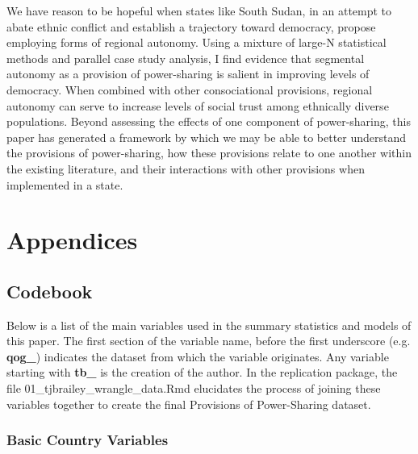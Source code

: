 \documentclass[12pt]{article}
\begin{document}
We have reason to be hopeful when states like South Sudan, in an attempt to abate ethnic conflict and establish a trajectory toward democracy, propose employing forms of regional autonomy. Using a mixture of large-N statistical methods and parallel case study analysis, I find evidence that segmental autonomy as a provision of power-sharing is salient in improving levels of democracy. When combined with other consociational provisions, regional autonomy can serve to increase levels of social trust among ethnically diverse populations. Beyond assessing the effects of one component of power-sharing, this paper has generated a framework by which we may be able to better understand the provisions of power-sharing, how these provisions relate to one another within the existing literature, and their interactions with other provisions when implemented in a state.

\pagebreak

\printbibliography

\pagebreak

\section{Appendices}
\subsection{Codebook}

Below is a list of the main variables used in the summary statistics and models of this paper. The first section of the variable name, before the first underscore (e.g. \textbf{qog\_}) indicates the dataset from which the variable originates. Any variable starting with \textbf{tb\_} is the creation of the author. In the replication package, the file 01\_tjbrailey\_wrangle\_data.Rmd elucidates the process of joining these variables together to create the final Provisions of Power-Sharing dataset.  

\newlength\cbl
\newenvironment{codebook}[1][rob\_avprison1]{
	\settowidth{\cbl}{#1}
	\parskip1em plus .3em minus .2em
	\parindent0pt
	\def\code##1##2{{\bfseries ##1}\hfill
		\parbox[t]{\dimexpr\linewidth-15em-\cbl}{##2}\par}}{\noindent}

\singlespacing

\subsubsection{Basic Country Variables}
	
\end{document}
